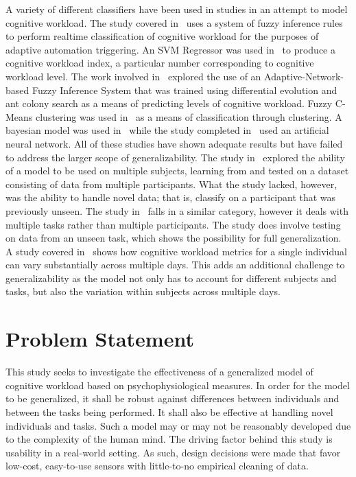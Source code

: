 \documentclass[11pt]{article}
\begin{document}
A variety of different classifiers have been used in studies in an attempt to model cognitive workload. The study covered in~\cite{Yang} uses a system of fuzzy inference rules to perform realtime classification of cognitive workload for the purposes of adaptive automation triggering. An SVM Regressor was used in~\cite{Ke} to produce a cognitive workload index, a particular number corresponding to cognitive workload level. The work involved in~\cite{Wang_R} explored the use of an Adaptive-Network-based Fuzzy Inference System that was trained using differential evolution and ant colony search as a means of predicting levels of cognitive workload. Fuzzy C-Means clustering was used in~\cite{Zhang} as a means of classification through clustering. A bayesian model was used in~\cite{Wang_Z} while the study completed in~\cite{Wilson} used an artificial neural network. All of these studies have shown adequate results but have failed to address the larger scope of generalizability. The study in~\cite{Wang_Z} explored the ability of a model to be used on multiple subjects, learning from and tested on a dataset consisting of data from multiple participants. What the study lacked, however, was the ability to handle novel data; that is, classify on a participant that was previously unseen. The study in~\cite{Wang_Z} falls in a similar category, however it deals with multiple tasks rather than multiple participants. The study does involve testing on data from an unseen task, which shows the possibility for full generalization. A study covered in~\cite{Christensen} shows how cognitive workload metrics for a single individual can vary substantially across multiple days. This adds an additional challenge to generalizability as the model not only has to account for different subjects and tasks, but also the variation within subjects across multiple days.

\section{Problem Statement}
This study seeks to investigate the effectiveness of a generalized model of cognitive workload based on psychophysiological measures. In order for the model to be generalized, it shall be robust against differences between individuals and between the tasks being performed. It shall also be effective at handling novel individuals and tasks. Such a model may or may not be reasonably developed due to the complexity of the human mind. The driving factor behind this study is usability in a real-world setting. As such, design decisions were made that favor low-cost, easy-to-use sensors with little-to-no empirical cleaning of data. 
\end{document}
